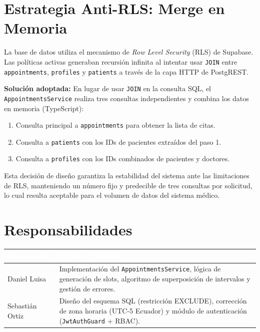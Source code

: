 \documentclass[a4paper,12pt]{article}
\renewcommand{\arraystretch}{1.1}
\begin{document}
    \section{Estrategia Anti-RLS: Merge en Memoria}

    La base de datos utiliza el mecanismo de \textit{Row Level Security} (RLS) de Supabase. Las políticas activas generaban recursión infinita al intentar usar \texttt{JOIN} entre \texttt{appointments}, \texttt{profiles} y \texttt{patients} a través de la capa HTTP de PostgREST.

    \textbf{Solución adoptada:} En lugar de usar \texttt{JOIN} en la consulta SQL, el \texttt{AppointmentsService} realiza tres consultas independientes y combina los datos en memoria (TypeScript):

    \begin{enumerate}
        \item Consulta principal a \texttt{appointments} para obtener la lista de citas.
        \item Consulta a \texttt{patients} con los IDs de pacientes extraídos del paso 1.
        \item Consulta a \texttt{profiles} con los IDs combinados de pacientes y doctores.
    \end{enumerate}

    Esta decisión de diseño garantiza la estabilidad del sistema ante las limitaciones de RLS, manteniendo un número fijo y predecible de tres consultas por solicitud, lo cual resulta aceptable para el volumen de datos del sistema médico.

    \section{Responsabilidades}

    \begin{table}[H]
    \centering\small\renewcommand{\arraystretch}{1.4}
    \begin{tabular}{|p{4.5cm}|p{9cm}|}
    \hline
    \rowcolor{SKTPrimary}
    \textcolor{white}{\textbf{Responsable}} & \textcolor{white}{\textbf{Rol en el Módulo}} \\
    \hline
    Daniel Luisa & Implementación del \texttt{AppointmentsService}, lógica de generación de slots, algoritmo de superposición de intervalos y gestión de errores. \\
    \hline
    Sebastián Ortiz & Diseño del esquema SQL (restricción EXCLUDE), corrección de zona horaria (UTC-5 Ecuador) y módulo de autenticación (\texttt{JwtAuthGuard} + RBAC). \\
    \hline
    \end{tabular}
    \end{table}
\end{document}
